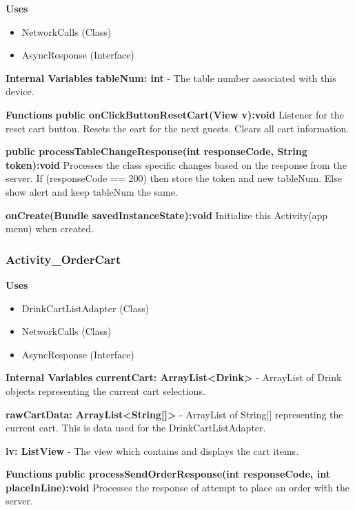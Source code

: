 \documentclass [10pt]{article}
\begin{document}
\textbf{Uses}
\begin{itemize}
	\item NetworkCalls (Class)
	\item AsyncResponse (Interface)
\end{itemize}

\textbf{Internal Variables}
\textbf{tableNum: int} - The table number associated with this device.

\textbf{Functions}
\textbf{public onClickButtonResetCart(View v):void}
Listener for the reset cart button. Resets the cart for the next guests. Clears all cart information.

\textbf{public processTableChangeResponse(int responseCode, String token):void}
Processes the class specific changes based on the response from the server. If (responseCode == 200) then store the token and new tableNum. Else show alert and keep tableNum the same.

\textbf{onCreate(Bundle savedInstanceState):void}
Initialize this Activity(app menu) when created.


\subsubsection{Activity\_OrderCart}

\textbf{Uses}

\begin{itemize}
	\item DrinkCartListAdapter (Class)
	\item NetworkCalls (Class)
	\item AsyncResponse (Interface)
\end{itemize}

\textbf{Internal Variables}
\textbf{currentCart: ArrayList<Drink>} - ArrayList of Drink objects representing the current cart selections.

\textbf{rawCartData: ArrayList<String[]>} - ArrayList of String[] representing the current cart. This is data used for the DrinkCartListAdapter.

\textbf{lv: ListView} - The view which contains and displays the cart items.

\textbf{Functions}
\textbf{public processSendOrderResponse(int responseCode, int placeInLine):void}
Processes the response of attempt to place an order with the server.
\end{document}
